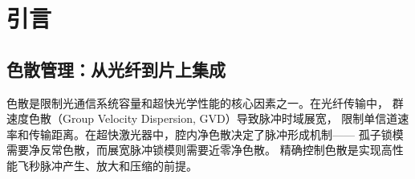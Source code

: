 \documentclass[12pt,a4paper,twoside]{article}
\begin{document}
\begin{abstract}
This paper presents a comprehensive review of SiN waveguide chirped Bragg gratings
from 1987 to 2026, covering over 40 key publications. We begin with the theoretical
foundations of CBGs, from classical coupled-mode theory to the effective-refractive-index
transfer-matrix method suitable for high-index-contrast waveguides. We then
chronologically trace the advances in on-chip dispersion compensation: from the
first centimeter-scale spiral grating (2020, 1440~ps group delay, $-$156.5~ps/nm
dispersion), through record-breaking group delays (2023, 2864~ps, 65.87~ns$\cdot$nm
delay-bandwidth product), to ultrabroadband pulse compression (2025, 164~nm bandwidth,
62~fs pulses). We further discuss digitally tunable positive/negative dispersion using
chirped multimode waveguide gratings ($\pm$63.77~ps/nm) and TM-type fabrication-robust
designs. The application of SiN apodized chirped gratings for dispersion management
in integrated mode-locked lasers is reviewed, along with III-V/SiN heterogeneous
integration schemes. Finally, we summarize derivative technologies including
contra-directional couplers, subwavelength grating chirped structures, and
reconfigurable Bragg gratings, and outline future research directions.

\textbf{Keywords:} chirped Bragg grating; silicon nitride waveguide; dispersion
compensation; mode-locked laser; integrated photonics; coupled-mode theory;
transfer matrix method; pulse compression; contra-directional coupler
\end{abstract}

\newpage
\tableofcontents
\newpage

\section{引言}

\subsection{色散管理：从光纤到片上集成}

色散是限制光通信系统容量和超快光学性能的核心因素之一。在光纤传输中，
群速度色散（Group Velocity Dispersion, GVD）导致脉冲时域展宽，
限制单信道速率和传输距离。在超快激光器中，腔内净色散决定了脉冲形成机制——
孤子锁模需要净反常色散，而展宽脉冲锁模则需要近零净色散。
精确控制色散是实现高性能飞秒脉冲产生、放大和压缩的前提。
\end{document}
